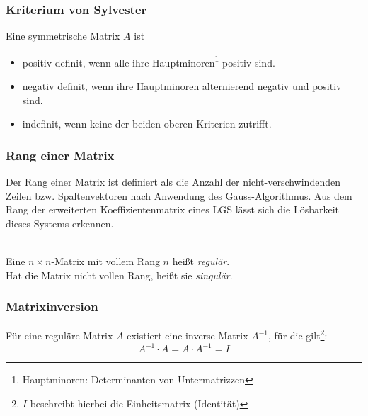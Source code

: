 \subsubsection{Kriterium von Sylvester}
\label{ssub:kriterium_von_sylvester}

Eine symmetrische Matrix $A$ ist 
\begin{itemize}
	\item positiv definit, wenn alle ihre Hauptminoren\footnote{Hauptminoren: Determinanten von Untermatrizzen} positiv sind.
	\item negativ definit, wenn ihre Hauptminoren alternierend negativ und positiv sind.
	\item indefinit, wenn keine der beiden oberen Kriterien zutrifft.
\end{itemize}

\subsubsection{Rang einer Matrix}
\label{ssub:rang_einer_matrix}
Der Rang einer Matrix ist definiert als die Anzahl der nicht-verschwindenden Zeilen bzw. Spaltenvektoren nach Anwendung
des Gauss-Algorithmus. Aus dem Rang der erweiterten Koeffizientenmatrix eines LGS lässt sich die Lösbarkeit dieses
Systems erkennen.\\ \\
\begin{center}
	Eine $n \times n$-Matrix mit vollem Rang $n$ heißt \emph{regulär}.\\
	Hat die Matrix nicht vollen Rang, heißt sie \emph{singulär}.	
\end{center}


\subsubsection{Matrixinversion} 
\label{ssub:matrixinversion}

Für eine reguläre Matrix $A$ existiert eine inverse Matrix $A^{-1}$, für die gilt\footnote{$I$ beschreibt hierbei
 die Einheitsmatrix (Identität)}: 
\begin{equation}
	A^{-1} \cdot A = A \cdot A^{-1} = I
\end{equation}

